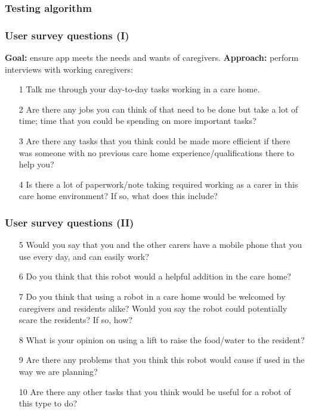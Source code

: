 \documentclass{beamer}
\begin{document}
\begin{frame}
  \frametitle{Testing algorithm}
  \begin{algorithm}[H]
  \end{algorithm}
\end{frame}
\begin{frame}
  \frametitle{User survey questions (I)}
  {\bf Goal: } ensure app meets the needs and wants of caregivers.
  {\bf Approach: } perform interviews with working caregivers: 
  \begin{enumerate}
    \item[1] Talk me through your day-to-day tasks working in a care home.
    \item[2] Are there any jobs you can think of that need to be done but take a lot of time; time that you could be spending on more important tasks?
    \item[3] Are there any tasks that you think could be made more efficient if there was someone with no previous care home experience/qualifications there to help you?
    \item[4]  Is there a lot of paperwork/note taking required working as a carer in this care home environment? If so, what does this include?
  \end{enumerate}
\end{frame}

\begin{frame}
  \frametitle{User survey questions (II)}
  \begin{enumerate}
    \item[5] Would you say that you and the other carers have a mobile phone that you use every day, and can easily work?
    \item[6] Do you think that this robot would a helpful addition in the care home?
    \item[7] Do you think that using a robot in a care home would be welcomed by caregivers and residents alike? Would you say the robot could potentially scare the residents? If so, how?
    \item[8] What is your opinion on using a lift to raise the food/water to the resident?
    \item[9] Are there any problems that you think this robot would cause if used in the way we are planning?
    \item[10] Are there any other tasks that you think would be useful for a robot of this type to do?
  \end{enumerate}
\end{frame}
\end{document}
